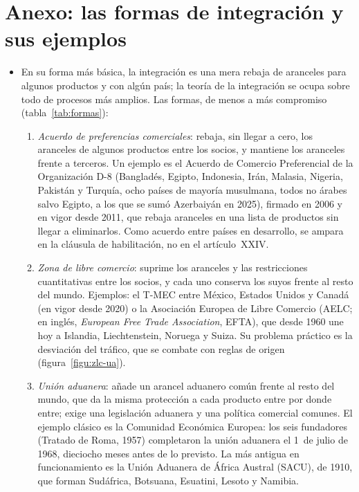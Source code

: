 \documentclass[11pt]{article}
\begin{document}
\clearpage
\appendix

\section{Anexo: las formas de integración y sus ejemplos}\label{anexo:formas}

\begin{itemize}
\item En su forma más básica, la integración es una mera rebaja de aranceles para algunos productos y con algún país; la teoría de la integración se ocupa sobre todo de procesos más amplios. Las formas, de menos a más compromiso (tabla~\ref{tab:formas}):
  \begin{enumerate}
  \item \emph{Acuerdo de preferencias comerciales}: rebaja, sin llegar a cero, los aranceles de algunos productos entre los socios, y mantiene los aranceles frente a terceros. Un ejemplo es el Acuerdo de Comercio Preferencial de la Organización D-8 (Bangladés, Egipto, Indonesia, Irán, Malasia, Nigeria, Pakistán y Turquía, ocho países de mayoría musulmana, todos no árabes salvo Egipto, a los que se sumó Azerbaiyán en 2025), firmado en 2006 y en vigor desde 2011, que rebaja aranceles en una lista de productos sin llegar a eliminarlos\nocite{APP2026D8PTA,D82025Azerbaiyan}. Como acuerdo entre países en desarrollo, se ampara en la cláusula de habilitación, no en el artículo~XXIV\nocite{GATT1979Habilitacion}.
  \item \emph{Zona de libre comercio}: suprime los aranceles y las restricciones cuantitativas entre los socios, y cada uno conserva los suyos frente al resto del mundo. Ejemplos: el T-MEC entre México, Estados Unidos y Canadá (en vigor desde 2020) o la Asociación Europea de Libre Comercio (AELC; en inglés, \emph{European Free Trade Association}, EFTA), que desde 1960 une hoy a Islandia, Liechtenstein, Noruega y Suiza\nocite{OMC2026RTAISExportacion}. Su problema práctico es la desviación del tráfico, que se combate con reglas de origen (figura~\ref{figu:zlc-ua}).
  \item \emph{Unión aduanera}: añade un arancel aduanero común frente al resto del mundo, que da la misma protección a cada producto entre por donde entre; exige una legislación aduanera y una política comercial comunes. El ejemplo clásico es la Comunidad Económica Europea: los seis fundadores (Tratado de Roma, 1957) completaron la unión aduanera el 1~de julio de 1968, dieciocho meses antes de lo previsto\nocite{CCE1968UnionAduanera}. La más antigua en funcionamiento es la Unión Aduanera de África Austral (SACU), de 1910, que forman Sudáfrica, Botsuana, Esuatini, Lesoto y Namibia\nocite{SACU2026Historia}.

\end{enumerate}
\end{itemize}
\end{document}
